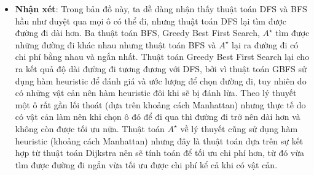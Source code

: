 \documentclass[11pt]{article} %
\begin{document}
\begin{itemize}
\begin{figure}[h]
\begin{tabular}{cc}
		\end{tabular}
	\end{figure}
	\begin{itemize}
		\item \textbf{Nhận xét}: Trong bản đồ này, ta dễ dàng nhận thấy thuật toán DFS và BFS hầu như duyệt qua mọi ô có thể đi, nhưng thuật toán DFS lại tìm được đường đi dài hơn. Ba thuật toán BFS, Greedy Best First Search, $A^{\star}$ tìm được những đường đi khác nhau nhưng thuật toán BFS và $A^{\star}$ lại ra đường đi có chi phí bằng nhau và ngắn nhất. Thuật toán Greedy Best First Search lại cho ra kết quả độ dài đường đi tương đương với DFS, bởi vì thuật toán GBFS sử dụng hàm heuristic để đánh giá và ước lượng để chọn đường đi, tuy nhiên do có những vật cản nên hàm heuristic đôi khi sẽ bị đánh lừa. Theo lý thuyết một ô rất gần lối thoát (dựa trên khoảng cách Manhattan) nhưng thực tế do có vật cản làm nên khi chọn ô đó để đi qua thì đường đi trở nên dài hơn và không còn được tối ưu nữa. Thuật toán $A^{\star}$ về lý thuyết cũng sử dụng hàm heuristic (khoảng cách Manhattan) nhưng đây là thuật toán dựa trên sự kết hợp từ thuật toán Dijkstra nên sẽ tính toán để tối ưu chi phí hơn, từ đó vừa tìm được đường đi ngắn vừa tối ưu được chi phí kể cả khi có vật cản.
	\end{itemize}


\end{itemize}
\end{document}
